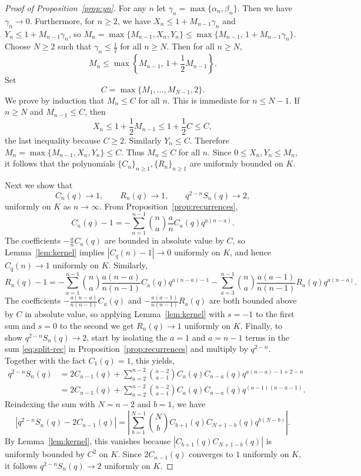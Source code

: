 \documentclass[10pt,a4paper]{amsart}
\begin{document}
\begin{proof}[Proof of Proposition~\ref{prop:yn}]
For any $n$ let $\gamma_n=\max\{\alpha_n,\beta_n\}.$ Then we have $\gamma_n\to 0$. Furthermore, for $n\ge 2$, we have $X_n\le 1+M_{n-1}\gamma_n$ and $Y_n\le 1+M_{n-1}\gamma_n$, so $M_n=\max\{M_{n-1},X_n,Y_n\}\le \max\{M_{n-1},\,1+M_{n-1}\gamma_n\}.$ Choose $N \geq 2$ such that \(\gamma_n\le \tfrac12\) for all \(n\ge N\). Then for all \(n\ge N\),
\[
M_n\le \max\left\{M_{n-1},\,1+\frac12 M_{n-1}\right\}.
\]
Set
\[
C=\max\{M_1,\dots,M_{N-1},2\}.
\]
We prove by induction that $M_n\le C$ for all $n$. This is immediate for $n\le N-1$. If $n\ge N$ and $M_{n-1}\le C$, then
\[
X_n\le 1+\frac12 M_{n-1}\le 1+\frac12 C\le C,
\]
the last inequality because $C \geq 2$. Similarly $Y_n\le C$. Therefore $M_n=\max\{M_{n-1},X_n,Y_n\}\le C.$ Thus $M_n\le C$ for all $n$. Since $0\le X_n,Y_n\le M_n$, it follows that the polynomials $\{C_n\}_{n \geq 1},\{R_n\}_{n \geq 1}$ are uniformly bounded on $K$.

Next we show that
\[
C_n(q) \to 1, \qquad R_n(q) \to 1, \qquad q^{2-n}S_n(q) \to 2,
\]
uniformly on $K$ as $n \to \infty$. From Proposition~\ref{prop:recurrences},
\[
C_n(q)-1=-\sum_{a=1}^{n-1}\binom{n}{a}\frac{a}{n}C_a(q)q^{a(n-a)}.
\]
The coefficients $-\frac{a}{n}C_a(q)$ are bounded in absolute value by $C$, so Lemma~\ref{lem:kernel} implies $|C_q(n)-1| \to 0$ uniformly on $K$, and hence $C_q(n) \to 1$ uniformly on $K$. Similarly,
\[
R_n(q)-1 = -\sum_{a=1}^{n-1} \binom{n}{a} \frac{a(n-a)}{n(n-1)}C_a(q)q^{a(n-a)-1} - \sum_{a=3}^{n-1} \binom{n}{a} \frac{a(a-1)}{n(n-1)}R_a(q)q^{a(n-a)}.
\]
The coefficients $-\frac{a(n-a)}{n(n-1)}C_a(q)$ and $-\frac{a(a-1)}{n(n-1)}R_a(q)$ are both bounded above by $C$ in absolute value, so applying Lemma~\ref{lem:kernel} with $s=-1$ to the first sum and $s=0$ to the second we get $R_n(q) \to 1$ uniformly on $K$. Finally, to show $q^{2-n}S_n(q) \to 2$, start by isolating the $a=1$ and $a=n-1$ terms in the sum \eqref{eq:split-rec} in Proposition~\ref{prop:recurrences} and multiply by $q^{2-n}$. Together with the fact $C_1(q)=1$, this yields,
\begin{align*}
q^{2-n}S_n(q) &= 2C_{n-1}(q) + \sum_{a=2}^{n-2} \binom{n-2}{a-1} C_a(q)C_{n-a}(q)q^{a(n-a)-1+2-n} \\
&= 2C_{n-1}(q) + \sum_{a=2}^{n-2} \binom{n-2}{a-1} C_a(q)C_{n-a}(q)q^{(a-1)(n-a-1)}.
\end{align*}
Reindexing the sum with $N=n-2$ and $b=1$, we have 
\[
\left|q^{2-n}S_n(q)-2C_{n-1}(q)\right|=\left|\sum_{b=1}^{N-1} \binom{N}{b} C_{b+1}(q)C_{N+1-b}(q)q^{b(N-b)}\right|.
\]
By Lemma~\ref{lem:kernel}, this vanishes because $|C_{b+1}(q)C_{N+1-b}(q)|$ is uniformly bounded by $C^2$ on $K$. Since $2C_{n-1}(q)$ converges to $1$ uniformly on $K$, it follows $q^{2-n}S_n(q) \to 2$ uniformly on $K$. 


\end{proof}
\end{document}
